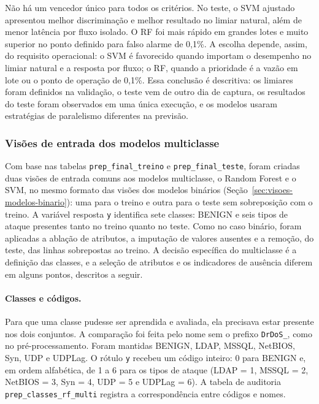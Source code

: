 \documentclass[
    12pt,                %
    openright,           %
    oneside,             %
    a4paper,             %
    english,             %
    brazil               %
]{abntex2}
\begin{document}
Não há um vencedor único para todos os critérios. No teste, o SVM ajustado apresentou melhor discriminação e melhor resultado no limiar natural, além de menor latência por fluxo isolado. O RF foi mais rápido em grandes lotes e muito superior no ponto definido para falso alarme de 0,1\%. A escolha depende, assim, do requisito operacional: o SVM é favorecido quando importam o desempenho no limiar natural e a resposta por fluxo; o RF, quando a prioridade é a vazão em lote ou o ponto de operação de 0,1\%. Essa conclusão é descritiva: os limiares foram definidos na validação, o teste vem de outro dia de captura, os resultados do teste foram observados em uma única execução, e os modelos usaram estratégias de paralelismo diferentes na previsão.

\subsubsection{Visões de entrada dos modelos multiclasse}
\label{sec:visoes-modelos-multiclasse}

Com base nas tabelas \texttt{prep\_final\_treino} e \texttt{prep\_final\_teste}, foram criadas duas visões de entrada comuns aos modelos multiclasse, o Random Forest e o SVM, no mesmo formato das visões dos modelos binários (Seção~\ref{sec:visoes-modelos-binario}): uma para o treino e outra para o teste sem sobreposição com o treino. A variável resposta \texttt{y} identifica sete classes: BENIGN e seis tipos de ataque presentes tanto no treino quanto no teste. Como no caso binário, foram aplicadas a ablação de atributos, a imputação de valores ausentes e a remoção, do teste, das linhas sobrepostas ao treino. A decisão específica do multiclasse é a definição das classes, e a seleção de atributos e os indicadores de ausência diferem em alguns pontos, descritos a seguir.

\paragraph{Classes e códigos.}
Para que uma classe pudesse ser aprendida e avaliada, ela precisava estar presente nos dois conjuntos. A comparação foi feita pelo nome sem o prefixo \texttt{DrDoS\_}, como no pré-processamento. Foram mantidas BENIGN, LDAP, MSSQL, NetBIOS, Syn, UDP e UDPLag. O rótulo \texttt{y} recebeu um código inteiro: 0 para BENIGN e, em ordem alfabética, de 1 a 6 para os tipos de ataque (LDAP = 1, MSSQL = 2, NetBIOS = 3, Syn = 4, UDP = 5 e UDPLag = 6). A tabela de auditoria \texttt{prep\_classes\_rf\_multi} registra a correspondência entre códigos e nomes.
\end{document}
